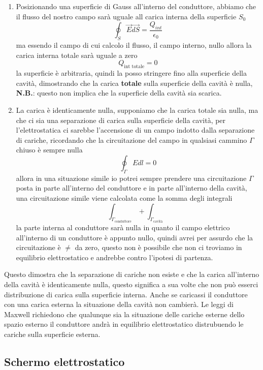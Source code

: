 \documentclass[a4paper, 12pt]{book}
\theoremstyle{plain}
\begin{document}
\begin{enumerate}
    \item Posizionando una superficie di Gauss all'interno del conduttore, abbiamo che il flusso del nostro campo sarà uguale all carica interna della superficie $S_0$ \[ \oint_S \vec{E}\vec{dS} = \frac{Q_{int}}{\epsilon_0}\] ma essendo il campo 
    di cui calcolo il flusso, il campo interno,  nullo allora la carica interna totale sarà uguale a zero \[Q_{\textrm{int totale}} = 0\] la superficie è arbitraria, quindi la posso stringere fino alla superficie della cavità, dimostrando che 
    la carica \textbf{totale} sulla superficie della cavità è nulla, \textbf{N.B.}: questo non implica che la superficie della cavità sia scarica.
    \item La carica è identicamente nulla, supponiamo che la carica totale sia nulla, ma che ci sia una separazione di carica sulla superficie della cavità, per l'elettrostatica ci sarebbe l'accensione di un campo 
    indotto dalla separazione di cariche, ricordando che la circuitazione del campo in qualsiasi cammino $\Gamma$ chiuso è sempre nulla \[ \oint_\Gamma Edl = 0 \] allora in una situazione simile io potrei sempre prendere una circuitazione $\Gamma$ posta 
    in parte all'interno del conduttore e in parte all'interno della cavità, una circuitazione simile viene calcolata come la somma degli integrali \[ \int_{\Gamma_{\textrm{conduttore}}} + \int_{\Gamma_{\textrm{cavità}}} \] la parte interna al conduttore sarà nulla 
    in quanto il campo elettrico all'interno di un conduttore è appunto nullo, quindi avrei per assurdo che la circuitazione è $\neq$ da zero, questo non è possibile che non ci troviamo in equilibrio elettrostatico e andrebbe contro l'ipotesi di partenza.
\end{enumerate}

Questo dimostra che la separazione di cariche non esiste e che la carica all'interno della cavità è identicamente nulla, questo significa a sua volte 
che non può esserci distribuzione di carica sulla superficie interna. Anche se caricassi il conduttore con una carica esterna la situazione della cavità non cambierà.
Le leggi di Maxwell richiedono che qualunque sia la situazione 
delle cariche esterne dello spazio esterno il conduttore 
andrà in equilibrio elettrostatico distrubuendo le cariche 
sulla superficie esterna.

\subsection{Schermo elettrostatico}
\end{document}
